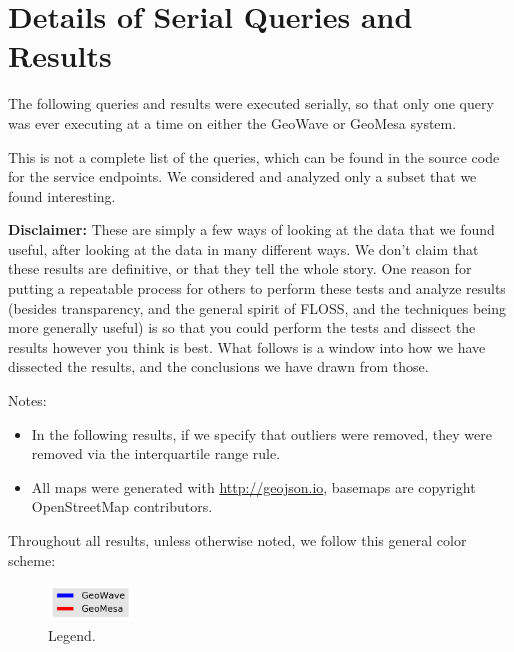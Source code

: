 \section{Details of Serial Queries and Results}
\label{appendix:queries}

The following queries and results were executed serially, so that only one query was ever executing at a time on either the GeoWave or GeoMesa system.

This is not a complete list of the queries, which can be found in the source code for the service endpoints.
We considered and analyzed only a subset that we found interesting.

{\bf Disclaimer: }
These are simply a few ways of looking at the data that we found useful, after looking at the data in many different ways. We don't claim that these results are definitive, or that they tell the whole story.
One reason for putting a repeatable process for others to perform these tests and analyze results
(besides transparency, and the general spirit of FLOSS, and the techniques being more generally useful)
is so that you could perform the tests and dissect the results however you think is best.
What follows is a window into how we have dissected the results, and the conclusions we have drawn from those.

Notes:
\begin{itemize}
\item In the following results, if we specify that outliers were removed, they were removed via the interquartile range rule.
\item All maps were generated with \url{http://geojson.io}, basemaps are copyright OpenStreetMap contributors.
\end{itemize}

Throughout all results, unless otherwise noted, we follow this general color scheme:


\begin{figure}[h!tb]
  \centering
  \includegraphics[width=0.20\textwidth]{../docs/img/legend.png}
  \caption{Legend.}
  \label{legend}
\end{figure}

